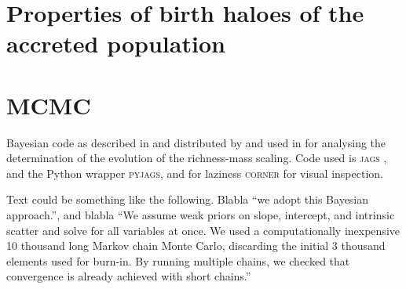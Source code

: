 \documentclass[12pt, a4paper]{article}
\begin{document}
\clearpage

\section{Properties of birth haloes of the accreted population}
\label{sec:accreted-birth-haloes}


\appendix
\section{MCMC}
Bayesian  code  as  described  in  and  distributed  by \citet{2012A&A...547A.117A}
and used in \citet{2014A&A...568A..23A} for analysing the determination 
of the evolution of the richness-mass scaling. Code used is \textsc{jags} 
\citep{plummer2003jags}, and the Python wrapper \textsc{pyjags}, and
for laziness \textsc{corner} \citep{corner} for visual inspection.

Text could be something like the following.
Blabla ``we adopt this Bayesian approach.'', and blabla
``We assume weak priors on slope, intercept, and intrinsic scatter and solve for 
all variables at once. We used a computationally inexpensive 10 thousand long 
Markov chain Monte Carlo, discarding the initial 3 thousand elements used for 
burn-in. By running multiple chains, we checked that convergence is already 
achieved with short chains.''



\end{document}
